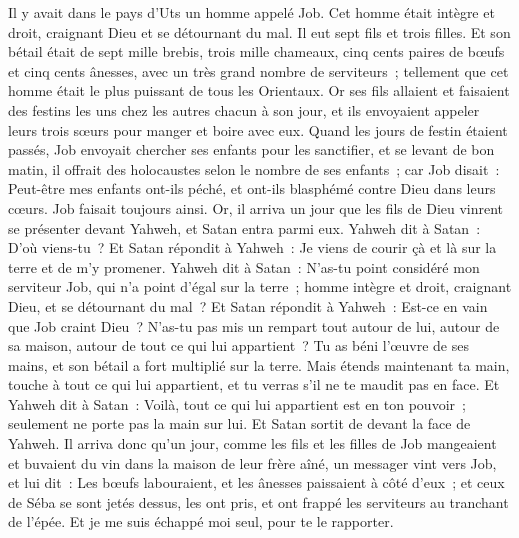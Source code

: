 \begin{multicols}{2}
\VerseOne{}Il y avait dans le pays d'Uts un homme appelé Job. Cet homme était intègre et droit, craignant Dieu et se détournant du mal.
Il eut sept fils et trois filles.
Et son bétail était de sept mille brebis, trois mille chameaux, cinq cents paires de bœufs et cinq cents ânesses, avec un très grand nombre de serviteurs~; tellement que cet homme était le plus puissant de tous les Orientaux.
Or ses fils allaient et faisaient des festins les uns chez les autres chacun à son jour, et ils envoyaient appeler leurs trois sœurs pour manger et boire avec eux.
Quand les jours de festin étaient passés, Job envoyait chercher ses enfants pour les sanctifier, et se levant de bon matin, il offrait des holocaustes selon le nombre de ses enfants~; car Job disait~: Peut-être mes enfants ont-ils péché, et ont-ils blasphémé contre Dieu dans leurs cœurs. Job faisait toujours ainsi.
Or, il arriva un jour que les fils de Dieu vinrent se présenter devant Yahweh, et Satan entra parmi eux.
Yahweh dit à Satan~: D'où viens-tu~? Et Satan répondit à Yahweh~: Je viens de courir çà et là sur la terre et de m'y promener.
Yahweh dit à Satan~: N'as-tu point considéré mon serviteur Job, qui n'a point d'égal sur la terre~; homme intègre et droit, craignant Dieu, et se détournant du mal~?
Et Satan répondit à Yahweh~: Est-ce en vain que Job craint Dieu~?
N'as-tu pas mis un rempart tout autour de lui, autour de sa maison, autour de tout ce qui lui appartient~? Tu as béni l'œuvre de ses mains, et son bétail a fort multiplié sur la terre.
Mais étends maintenant ta main, touche à tout ce qui lui appartient, et tu verras s'il ne te maudit pas en face.
Et Yahweh dit à Satan~: Voilà, tout ce qui lui appartient est en ton pouvoir~; seulement ne porte pas la main sur lui. Et Satan sortit de devant la face de Yahweh.
Il arriva donc qu'un jour, comme les fils et les filles de Job mangeaient et buvaient du vin dans la maison de leur frère aîné, un messager vint vers Job,
et lui dit~: Les bœufs labouraient, et les ânesses paissaient à côté d'eux~;
et ceux de Séba se sont jetés dessus, les ont pris, et ont frappé les serviteurs au tranchant de l'épée. Et je me suis échappé moi seul, pour te le rapporter.

\end{multicols}
